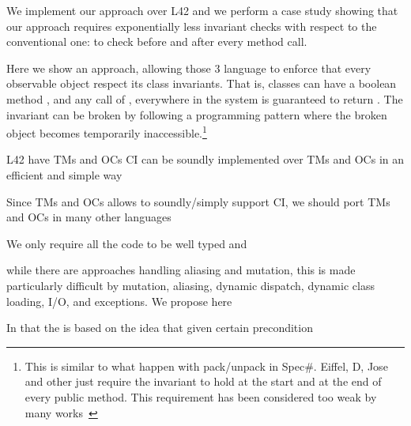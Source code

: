We implement our approach over L42 and we perform a
case study showing that our approach requires 
exponentially less invariant checks with respect to the conventional one: to check before and after every method call.


Here we show an approach, allowing those 3 language 
to  enforce that every observable object respect its class invariants.
That is, classes can have a boolean method \Q@invariant@,
and any call of \Q@invariant@, everywhere in the system is guaranteed to return \Q@true@.
The invariant can be broken by following a programming pattern where the broken object becomes temporarily inaccessible.\footnote{
	This is similar to what happen with pack/unpack in Spec\#.
	Eiffel, D, Jose and other just require the invariant to hold at the start and at the end of every public method. This requirement has been considered too weak by many works~\cite{??}
}





L42 have TMs and OCs
CI can be soundly implemented over TMs and OCs
in an efficient and simple way

Since TMs and OCs allows to soundly/simply support CI,
we should port TMs and OCs in many other languages


\LINE


We only require all the code to be well typed and 


while 
there are approaches handling aliasing and mutation,
this is made particularly difficult by mutation, aliasing, dynamic dispatch, dynamic class loading,
I/O, and exceptions.
We propose here 

In
that the 
is based on the idea that 
given certain precondition










 
